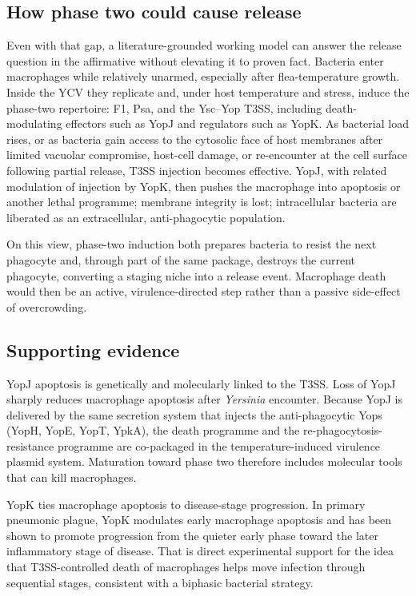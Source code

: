 \documentclass[11pt,a4paper]{article}
\begin{document}
\subsection{How phase two could cause release}

Even with that gap, a literature-grounded working model can answer the release question in the affirmative without elevating it to proven fact. Bacteria enter macrophages while relatively unarmed, especially after flea-temperature growth. Inside the YCV they replicate and, under host temperature and stress, induce the phase-two repertoire: F1, Psa, and the Ysc--Yop T3SS, including death-modulating effectors such as YopJ and regulators such as YopK. As bacterial load rises, or as bacteria gain access to the cytosolic face of host membranes after limited vacuolar compromise, host-cell damage, or re-encounter at the cell surface following partial release, T3SS injection becomes effective. YopJ, with related modulation of injection by YopK, then pushes the macrophage into apoptosis or another lethal programme; membrane integrity is lost; intracellular bacteria are liberated as an extracellular, anti-phagocytic population.

On this view, phase-two induction both prepares bacteria to resist the next phagocyte and, through part of the same package, destroys the current phagocyte, converting a staging niche into a release event. Macrophage death would then be an active, virulence-directed step rather than a passive side-effect of overcrowding.

\subsection{Supporting evidence}

YopJ apoptosis is genetically and molecularly linked to the T3SS. Loss of YopJ sharply reduces macrophage apoptosis after \textit{Yersinia} encounter. Because YopJ is delivered by the same secretion system that injects the anti-phagocytic Yops (YopH, YopE, YopT, YpkA), the death programme and the re-phagocytosis-resistance programme are co-packaged in the temperature-induced virulence plasmid system. Maturation toward phase two therefore includes molecular tools that can kill macrophages.

YopK ties macrophage apoptosis to disease-stage progression. In primary pneumonic plague, YopK modulates early macrophage apoptosis and has been shown to promote progression from the quieter early phase toward the later inflammatory stage of disease. That is direct experimental support for the idea that T3SS-controlled death of macrophages helps move infection through sequential stages, consistent with a biphasic bacterial strategy.
\end{document}
